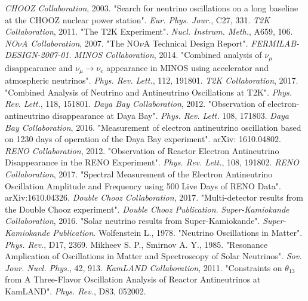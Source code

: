 \documentclass[english]{article}
\begin{document}
\begin{thebibliography}{99}
     \textit{CHOOZ Collaboration}, 2003. "Search for neutrino oscillations on a long baseline at the CHOOZ nuclear power station". \textit{Eur. Phys. Jour.}, C27, 331.
    \textit{T2K Collaboration}, 2011. "The T2K Experiment". \textit{Nucl. Instrum. Meth.}, A659, 106.
    \textit{NO$\nu$A Collaboration}, 2007. "The NO$\nu$A Technical Design Report". \textit{FERMILAB-DESIGN-2007-01}.
    \textit{MINOS Collaboration}, 2014. "Combined analysis of $\nu_{\mu}$ disappearance and $\nu_{\mu} \rightarrow \nu_{e}$ appearance in MINOS using
accelerator and atmospheric neutrinos". \textit{Phys. Rev. Lett.}, 112, 191801.
    \textit{T2K Collaboration}, 2017. "Combined Analysis of Neutrino and Antineutrino Oscillations at T2K". \textit{Phys. Rev. Lett.}, 118, 151801.
    \textit{Daya Bay Collaboration}, 2012. "Observation of electron-antineutrino disappearance at Daya Bay". \textit{Phys. Rev. Lett.} 108, 171803.
    \textit{Daya Bay Collaboration}, 2016. "Measurement of electron antineutrino oscillation based on 1230 days of operation of the Daya Bay experiment". arXiv: 1610.04802.
    \textit{RENO Collaboration}, 2012. "Observation of Reactor Electron Antineutrino Disappearance in the RENO Experiment". \textit{Phys. Rev. Lett.}, 108, 191802.
    \textit{RENO Collaboration}, 2017. "Spectral Measurement of the Electron Antineutrino Oscillation Amplitude and Frequency using 500 Live Days of RENO Data". arXiv:1610.04326.
    \textit{Double Chooz Collaboration}, 2017. "Multi-detector results from the Double Chooz experiment". \textit{Double Chooz Publication}.
    \textit{Super-Kamiokande Collaboration}, 2016. "Solar neutrino results from Super-Kamiokande". \textit{Super-Kamiokande Publication}.
    Wolfenstein L., 1978. "Neutrino Oscillations in Matter". \textit{Phys. Rev.}, D17, 2369.
    Mikheev S. P., Smirnov A. Y., 1985. "Resonance Amplication of Oscillations in Matter and Spectroscopy of Solar Neutrinos". \textit{Sov. Jour. Nucl. Phys.}, 42, 913.
    \textit{KamLAND Collaboration}, 2011. "Constraints on $\theta_{13}$ from A Three-Flavor Oscillation Analysis of Reactor Antineutrinos at KamLAND". \textit{Phys. Rev.}, D83, 052002.
    
\end{thebibliography}
\end{document}
